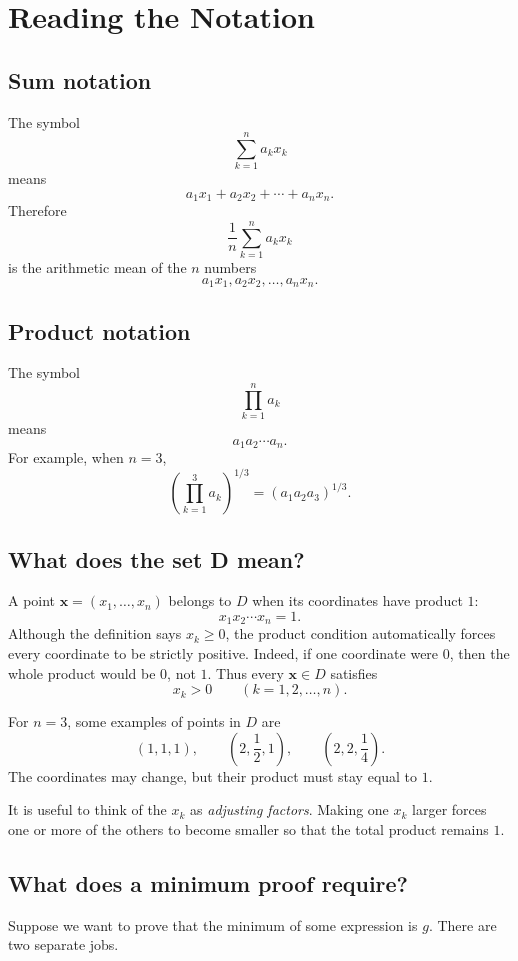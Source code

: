\documentclass[11pt]{article}
\begin{document}
\section{Reading the Notation}

\subsection{Sum notation}

The symbol
\[
 \sum_{k=1}^{n}a_kx_k
\]
means
\[
 a_1x_1+a_2x_2+\cdots+a_nx_n.
\]
Therefore
\[
 \frac1n\sum_{k=1}^{n}a_kx_k
\]
is the arithmetic mean of the $n$ numbers
\[
 a_1x_1,a_2x_2,\ldots,a_nx_n.
\]

\subsection{Product notation}

The symbol
\[
 \prod_{k=1}^{n}a_k
\]
means
\[
 a_1a_2\cdots a_n.
\]
For example, when $n=3$,
\[
 \left(\prod_{k=1}^{3}a_k\right)^{1/3}
 =(a_1a_2a_3)^{1/3}.
\]

\subsection{What does the set D mean?}

A point $\mathbf x=(x_1,\ldots,x_n)$ belongs to $D$ when its coordinates have
product $1$:
\[
 x_1x_2\cdots x_n=1.
\]
Although the definition says $x_k\ge0$, the product condition automatically
forces every coordinate to be strictly positive.  Indeed, if one coordinate
were $0$, then the whole product would be $0$, not $1$.  Thus every
$\mathbf x\in D$ satisfies
\[
 x_k>0\qquad(k=1,2,\ldots,n).
\]

For $n=3$, some examples of points in $D$ are
\[
 (1,1,1),
 \qquad
 \left(2,\frac12,1\right),
 \qquad
 \left(2,2,\frac14\right).
\]
The coordinates may change, but their product must stay equal to $1$.

It is useful to think of the $x_k$ as \emph{adjusting factors}.  Making one
$x_k$ larger forces one or more of the others to become smaller so that the
total product remains $1$.

\subsection{What does a minimum proof require?}

Suppose we want to prove that the minimum of some expression is $g$.  There are
two separate jobs.
\end{document}
